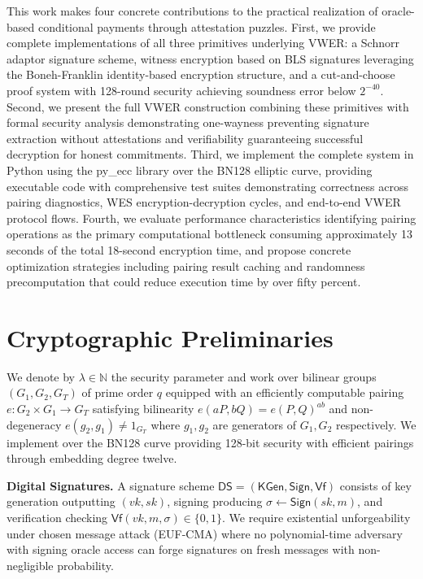 \documentclass[11pt,a4paper]{article}
\newcommand{\KGen}{\textsf{KGen}}
\newcommand{\Sign}{\textsf{Sign}}
\newcommand{\Vf}{\textsf{Vf}}
\begin{document}
{This work makes four concrete contributions to the practical realization of oracle-based conditional payments through attestation puzzles. First, we provide complete implementations of all three primitives underlying VWER: a Schnorr adaptor signature scheme, witness encryption based on BLS signatures leveraging the Boneh-Franklin identity-based encryption structure, and a cut-and-choose proof system with 128-round security achieving soundness error below $2^{-40}$. Second, we present the full VWER construction combining these primitives with formal security analysis demonstrating one-wayness preventing signature extraction without attestations and verifiability guaranteeing successful decryption for honest commitments. Third, we implement the complete system in Python using the py\_ecc library over the BN128 elliptic curve, providing executable code with comprehensive test suites demonstrating correctness across pairing diagnostics, WES encryption-decryption cycles, and end-to-end VWER protocol flows. Fourth, we evaluate performance characteristics identifying pairing operations as the primary computational bottleneck consuming approximately 13 seconds of the total 18-second encryption time, and propose concrete optimization strategies including pairing result caching and randomness precomputation that could reduce execution time by over fifty percent.

\section{Cryptographic Preliminaries}

We denote by $\lambda \in \mathbb{N}$ the security parameter and work over bilinear groups $(G_1, G_2, G_T)$ of prime order $q$ equipped with an efficiently computable pairing $e: G_2 \times G_1 \to G_T$ satisfying bilinearity $e(aP, bQ) = e(P, Q)^{ab}$ and non-degeneracy $e(g_2, g_1) \neq 1_{G_T}$ where $g_1, g_2$ are generators of $G_1, G_2$ respectively. We implement over the BN128 curve providing 128-bit security with efficient pairings through embedding degree twelve.

\textbf{Digital Signatures.} A signature scheme $\textsf{DS} = (\KGen, \Sign, \Vf)$ consists of key generation outputting $(vk, sk)$, signing producing $\sigma \leftarrow \Sign(sk, m)$, and verification checking $\Vf(vk, m, \sigma) \in \{0,1\}$. We require existential unforgeability under chosen message attack (EUF-CMA) where no polynomial-time adversary with signing oracle access can forge signatures on fresh messages with non-negligible probability.

}
\end{document}
